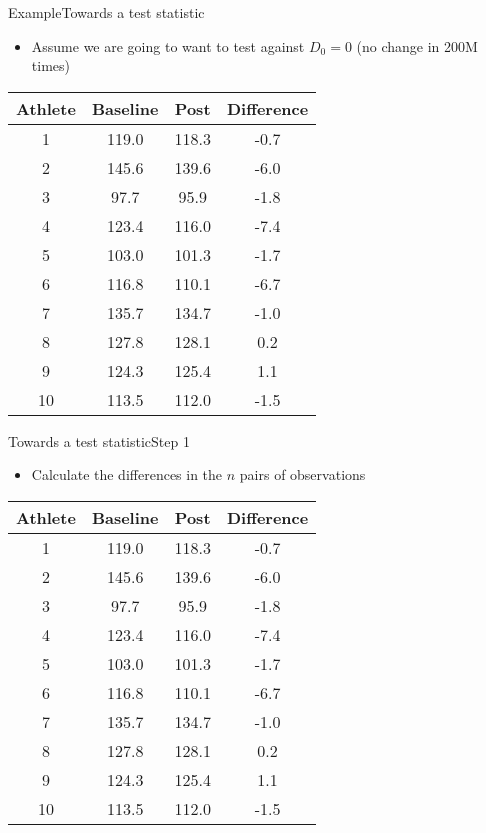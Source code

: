 \documentclass[xcolor=dvipsnames]{beamer}
\begin{document}
\begin{frame}{Example}{Towards a test statistic}
	\begin{itemize}
		\item Assume we are going to want to test against $D_0 = 0$ (no change in 200M times)
	\end{itemize}
	\begin{center}
	\begin{tabular}{|c|c|c|c|}
		\hline
		\textbf{Athlete} &  \textbf{Baseline} &      \textbf{Post}    & \textbf{Difference} \\ \hline 
		\hline
		1  &     119.0 &  118.3 &  -0.7\\ \hline
		2   &    145.6 &  139.6 &  -6.0\\ \hline
		3    &    97.7 &   95.9 &  -1.8\\ \hline
		4    &   123.4 &  116.0 &  -7.4\\ \hline
		5    &   103.0 &  101.3 &  -1.7\\ \hline
		6    &   116.8 &  110.1 &  -6.7\\ \hline
		7     &  135.7 &  134.7 &  -1.0\\ \hline
		8     &  127.8 &  128.1 &   0.2\\ \hline
		9     &  124.3 &  125.4 &   1.1\\ \hline
		10    &  113.5 &  112.0 &  -1.5\\ \hline
	\end{tabular}
\end{center}
\end{frame}

\begin{frame}{Towards a test statistic}{Step 1}
\begin{itemize}
	\item Calculate the differences in the $n$ pairs of observations
\end{itemize}
\begin{center}
	\begin{tabular}{|c|c|c|c|}
		\hline
		\textbf{Athlete} &  \textbf{Baseline} &      \textbf{Post}    & \textbf{Difference} \\ \hline 
		\hline
		1  &     119.0 &  118.3 &  -0.7\\ \hline
		2   &    145.6 &  139.6 &  -6.0\\ \hline
		3    &    97.7 &   95.9 &  -1.8\\ \hline
		4    &   123.4 &  116.0 &  -7.4\\ \hline
		5    &   103.0 &  101.3 &  -1.7\\ \hline
		6    &   116.8 &  110.1 &  -6.7\\ \hline
		7     &  135.7 &  134.7 &  -1.0\\ \hline
		8     &  127.8 &  128.1 &   0.2\\ \hline
		9     &  124.3 &  125.4 &   1.1\\ \hline
		10    &  113.5 &  112.0 &  -1.5\\ \hline
	\end{tabular}
\end{center}
\end{frame}
\end{document}
